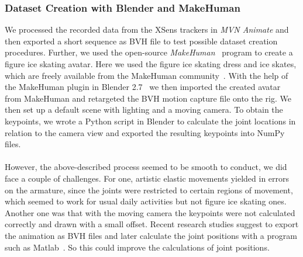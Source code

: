 \subsubsection*{Dataset Creation with Blender and MakeHuman}
We processed the recorded data from the XSens trackers in \textit{MVN Animate} and then exported a short sequence as BVH file
to test possible dataset creation procedures.
Further, we used the open-source \textit{MakeHuman}~\cite{makehuman} program to create a figure ice skating avatar.
Here we used the figure ice skating dress and ice skates, which are freely available from the MakeHuman
community~\cite{makehumanassets}.
With the help of the MakeHuman plugin in Blender 2.7~\cite{blender} we then imported the created avatar from MakeHuman
and retargeted the BVH motion capture file onto the rig.
We then set up a default scene with lighting and a moving camera.
To obtain the keypoints, we wrote a Python script in Blender to calculate the joint locations in relation to the camera
view and exported the resulting keypoints into NumPy files.
\\\mbox{}\\
However, the above-described process seemed to be smooth to conduct, we did face a couple of challenges.
For one, artistic elastic movements yielded in errors on the armature, since the joints were restricted to certain
regions of movement, which seemed to work for usual daily activities but not figure ice skating ones.
Another one was that with the moving camera the keypoints were not calculated correctly and drawn with a small offset.
Recent research studies suggest to export the animation as BVH files and later calculate the joint positions with a
program such as Matlab~\cite{synpose300, 3dpeople, gaitblender}. So this could improve the calculations of joint
positions.



